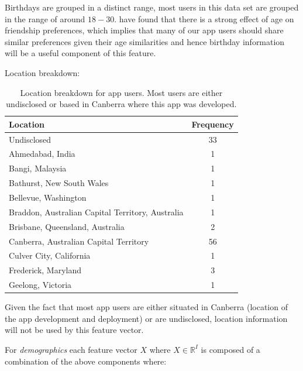 Birthdays are grouped in a distinct range, most users in this data set are grouped in the range of around $18 - 30$. 
\cite{jugand} have found that there is a strong effect of age on friendship preferences, which implies that many of our app users 
should share similar preferences given their age similarities and hence birthday information will be a useful component of this feature.

\clearpage

Location breakdown:

\begin{table}[!htbp]
\centering
	\begin{tabular}{|l|c|} %
		\hline
		\textbf{Location} & \textbf{Frequency}  \\ \hline
		Undisclosed & 33 \\ \hline
		Ahmedabad, India & 1 \\ \hline
		Bangi, Malaysia & 1 \\ \hline
		Bathurst, New South Wales & 1 \\ \hline
		Bellevue, Washington & 1 \\ \hline
		Braddon, Australian Capital Territory, Australia & 1 \\ \hline
		Brisbane, Queensland, Australia & 2 \\ \hline
		Canberra, Australian Capital Territory & 56 \\ \hline
		Culver City, California & 1 \\ \hline
		Frederick, Maryland & 3 \\ \hline
		Geelong, Victoria & 1 \\ \hline
	\end{tabular}
	\caption{Location breakdown for app users. Most users are either undisclosed or based in Canberra where this app was developed.}
	\label{tab:revpol}
\end{table}

Given the fact that most app users are either situated in Canberra (location of the app development and deployment) or are undisclosed, 
location information will not be used by this feature vector.

For \emph{demographics} each feature vector $X$ where $X \in \mathbb{R}^I$ is composed of a combination of the above components where:

